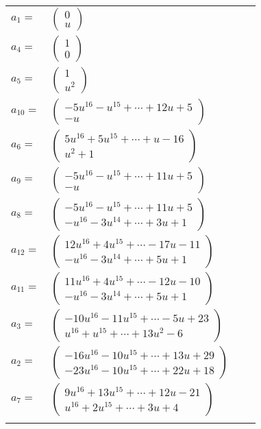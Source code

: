 \documentclass[1p]{elsarticle_modified}
\theoremstyle{definition}
\begin{document}
\begin{tabular}{m{7pt} m{180pt} m{7pt} m{180pt} }
\flushright $a_{1}=$&$\begin{pmatrix}0\\u\end{pmatrix}$ \\
\flushright $a_{4}=$&$\begin{pmatrix}1\\0\end{pmatrix}$ \\
\flushright $a_{5}=$&$\begin{pmatrix}1\\u^2\end{pmatrix}$ \\
\flushright $a_{10}=$&$\begin{pmatrix}-5 u^{16}- u^{15}+\cdots+12 u+5\\- u\end{pmatrix}$ \\
\flushright $a_{6}=$&$\begin{pmatrix}5 u^{16}+5 u^{15}+\cdots+u-16\\u^2+1\end{pmatrix}$ \\
\flushright $a_{9}=$&$\begin{pmatrix}-5 u^{16}- u^{15}+\cdots+11 u+5\\- u\end{pmatrix}$ \\
\flushright $a_{8}=$&$\begin{pmatrix}-5 u^{16}- u^{15}+\cdots+11 u+5\\- u^{16}-3 u^{14}+\cdots+3 u+1\end{pmatrix}$ \\
\flushright $a_{12}=$&$\begin{pmatrix}12 u^{16}+4 u^{15}+\cdots-17 u-11\\- u^{16}-3 u^{14}+\cdots+5 u+1\end{pmatrix}$ \\
\flushright $a_{11}=$&$\begin{pmatrix}11 u^{16}+4 u^{15}+\cdots-12 u-10\\- u^{16}-3 u^{14}+\cdots+5 u+1\end{pmatrix}$ \\
\flushright $a_{3}=$&$\begin{pmatrix}-10 u^{16}-11 u^{15}+\cdots-5 u+23\\u^{16}+u^{15}+\cdots+13 u^2-6\end{pmatrix}$ \\
\flushright $a_{2}=$&$\begin{pmatrix}-16 u^{16}-10 u^{15}+\cdots+13 u+29\\-23 u^{16}-10 u^{15}+\cdots+22 u+18\end{pmatrix}$ \\
\flushright $a_{7}=$&$\begin{pmatrix}9 u^{16}+13 u^{15}+\cdots+12 u-21\\u^{16}+2 u^{15}+\cdots+3 u+4\end{pmatrix}$\\&\end{tabular}
\end{document}
